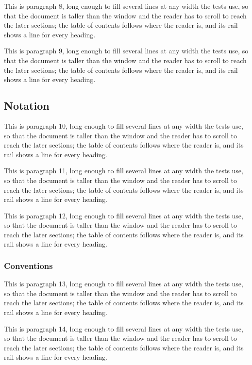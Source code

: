 This is paragraph 8, long enough to fill several lines at any width the tests use, so that the
document is taller than the window and the reader has to scroll to reach the later sections; the
table of contents follows where the reader is, and its rail shows a line for every heading.

This is paragraph 9, long enough to fill several lines at any width the tests use, so that the
document is taller than the window and the reader has to scroll to reach the later sections; the
table of contents follows where the reader is, and its rail shows a line for every heading.

\subsection{Notation}
This is paragraph 10, long enough to fill several lines at any width the tests use, so that the
document is taller than the window and the reader has to scroll to reach the later sections; the
table of contents follows where the reader is, and its rail shows a line for every heading.

This is paragraph 11, long enough to fill several lines at any width the tests use, so that the
document is taller than the window and the reader has to scroll to reach the later sections; the
table of contents follows where the reader is, and its rail shows a line for every heading.

This is paragraph 12, long enough to fill several lines at any width the tests use, so that the
document is taller than the window and the reader has to scroll to reach the later sections; the
table of contents follows where the reader is, and its rail shows a line for every heading.

\subsubsection{Conventions}
This is paragraph 13, long enough to fill several lines at any width the tests use, so that the
document is taller than the window and the reader has to scroll to reach the later sections; the
table of contents follows where the reader is, and its rail shows a line for every heading.

This is paragraph 14, long enough to fill several lines at any width the tests use, so that the
document is taller than the window and the reader has to scroll to reach the later sections; the
table of contents follows where the reader is, and its rail shows a line for every heading.

